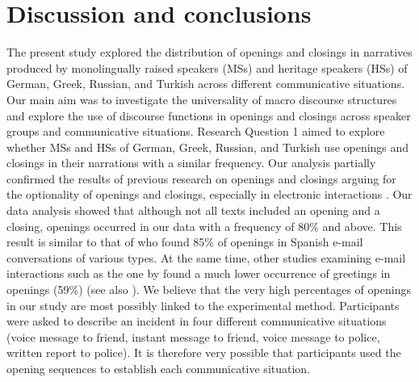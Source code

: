 \documentclass[output=paper,colorlinks,citecolor=brown]{langscibook}
\begin{document}
\section{Discussion and conclusions} \label{sec:katsikaetal:discussionconclusions}
The present study explored the distribution of openings and closings in narratives produced by monolingually raised speakers (MSs) and heritage speakers (HSs) of German, Greek, Russian, and Turkish across different communicative situations. Our main aim was to investigate the universality of macro discourse structures and explore the use of discourse functions in openings and closings across speaker groups and communicative situations. Research Question 1 aimed to explore whether MSs and HSs of German, Greek, Russian, and Turkish use openings and closings in their narrations with a similar frequency. Our analysis partially confirmed the results of previous research on openings and closings arguing for the optionality of openings and closings, especially in electronic interactions \parencite{baron_letters_1998, crystal_language_2001, herring_two_1996}. Our data analysis showed that although not all texts included an opening and a closing, openings occurred in our data with a frequency of 80\% and above. This result is similar to that of \textcite{bou-franch_openings_2011} who found 85\% of openings in Spanish e-mail conversations of various types. At the same time, other studies examining e-mail interactions such as the one by \textcite{waldvogel_greetings_2007} found a much lower occurrence of greetings in openings (59\%) (see also \cite{chapters/02}). We believe that the very high percentages of openings in our study are most possibly linked to the experimental method. Participants were asked to describe an incident in four different communicative situations (voice message to friend, instant message to friend, voice message to police, written report to police). It is therefore very possible that participants used the opening sequences to establish each communicative situation. 
\end{document}
